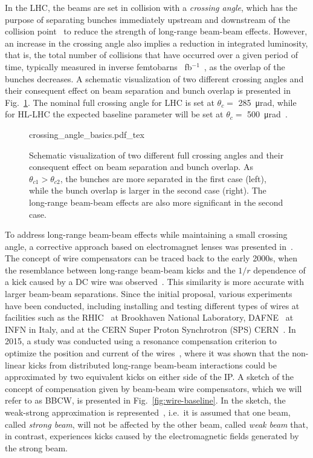 In the LHC, the beams are set in collision with a \textit{crossing angle}, which has the purpose of separating bunches immediately upstream and downstream of the collision point~\cite{Arduini_2016} to reduce the strength of long-range beam-beam effects. However, an increase in the crossing angle also implies a reduction in integrated luminosity, that is, the total number of collisions that have occurred over a given period of time, typically measured in inverse femtobarns \SI{}{fb}$^{-1}$~\cite{Herr:941318}, as the overlap of the bunches decreases. A schematic visualization of two different crossing angles and their consequent effect on beam separation and bunch overlap is presented in Fig.~\ref{fig:crossing-angles}. The nominal full crossing angle for LHC is set at $\theta_c =$ \SI{285}{\micro\radian}, while for HL-LHC the expected baseline parameter will be set at $\theta_c =$ \SI{500}{\micro\radian}~\cite{BejarAlonso:2749422}. 

\begin{figure}[th]
    \centering
    \def\svgwidth{1.0\textwidth}
    {crossing_angle_basics.pdf_tex}
    \caption{Schematic visualization of two different full crossing angles and their consequent effect on beam separation and bunch overlap. As $\theta_{c1} > \theta_{c2}$, the bunches are more separated in the first case (left), while the bunch overlap is larger in the second case (right). The long-range beam-beam effects are also more significant in the second case.}
    \label{fig:crossing-angles}
\end{figure}

To address long-range beam-beam effects while maintaining a small crossing angle, a corrective approach based on electromagnet lenses was presented in~\cite{Koutchouk:692058}. The concept of wire compensators can be traced back to the early 2000s, when the resemblance between long-range beam-beam kicks and the $1/r$ dependence of a kick caused by a DC wire was observed~\cite{PhysRevSTAB.5.074001, Koutchouk:692058}. This similarity is more accurate with larger beam-beam separations. Since the initial proposal, various experiments have been conducted, including installing and testing different types of wires at facilities such as the RHIC~\cite{PhysRevSTAB.14.091001} at Brookhaven National Laboratory, DAFNE~\cite{https://doi.org/10.48550/arxiv.0803.1544} at INFN in Italy, and at the CERN Super Proton Synchrotron (SPS) CERN~\cite{Zimmermann:1955353,Koutchouk:793423}. In 2015, a study was conducted using a resonance compensation criterion to optimize the position and current of the wires~\cite{Fartoukh:2052448}, where it was shown that the non-linear kicks from distributed long-range beam-beam interactions could be approximated by two equivalent kicks on either side of the IP. A sketch of the concept of compensation given by beam-beam wire compensators, which we will refer to as BBCW, is presented in Fig.~\ref{fig:wire-baseline}. In the sketch, the weak-strong approximation is represented~\cite{Pellegrini_2017,Banfi:1742126}, i.e.\ it is assumed that one beam, called \textit{strong beam}, will not be affected by the other beam, called \textit{weak beam} that, in contrast, experiences kicks caused by the electromagnetic fields generated by the strong beam.

